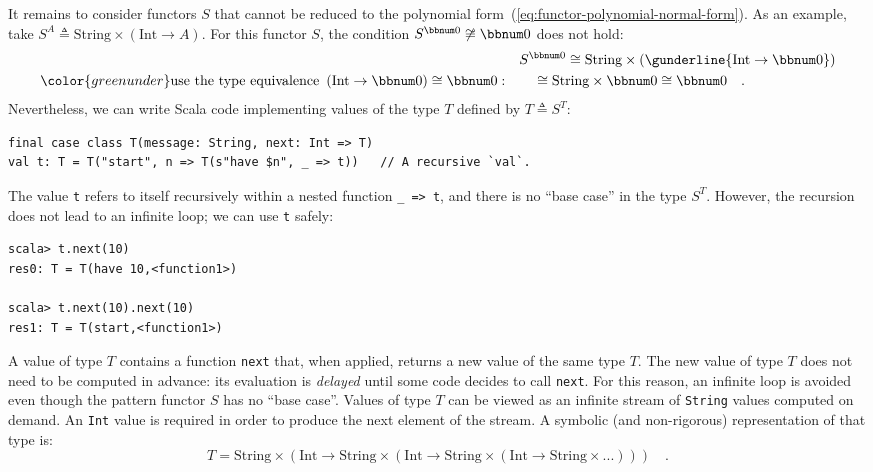 It remains to consider functors $S$ that cannot be reduced to the
polynomial form~(\ref{eq:functor-polynomial-normal-form}). As an
example, take $S^{A}\triangleq\text{String}\times(\text{Int}\rightarrow A)$.
For this functor $S$, the condition $S^{\bbnum 0}\not\cong\bbnum 0$
does not hold:
\begin{align*}
 & S^{\bbnum 0}\cong\text{String}\times(\gunderline{\text{Int}\rightarrow\bbnum 0})\\
{\color{greenunder}\text{use the type equivalence }\left(\text{Int}\rightarrow\bbnum 0\right)\cong\bbnum 0:}\quad & \quad\cong\text{String}\times\bbnum 0\cong\bbnum 0\quad.
\end{align*}
Nevertheless, we can write Scala code implementing values of the type
$T$ defined by $T\triangleq S^{T}$:
\begin{lstlisting}
final case class T(message: String, next: Int => T)
val t: T = T("start", n => T(s"have $n", _ => t))   // A recursive `val`.
\end{lstlisting}
The value \lstinline!t! refers to itself recursively within a nested
function \lstinline!_ => t!, and there is no \textsf{``}base case\textsf{''} in the
type $S^{T}$. However, the recursion does not lead to an infinite
loop; we can use \lstinline!t! safely:
\begin{lstlisting}
scala> t.next(10)
res0: T = T(have 10,<function1>)

scala> t.next(10).next(10)
res1: T = T(start,<function1>)
\end{lstlisting}
A value of type $T$ contains a function \lstinline!next! that, when
applied, returns a new value of the same type $T$. The new value
of type $T$ does not need to be computed in advance: its evaluation
is \emph{delayed} until some code decides to call \lstinline!next!.
For this reason, an infinite loop is avoided even though the pattern
functor $S$ has no \textsf{``}base case\textsf{''}. Values of type $T$ can be viewed
as an infinite stream of \lstinline!String! values computed on demand.
An \lstinline!Int! value is required in order to produce the next
element of the stream. A symbolic (and non-rigorous) representation
of that type is:
\[
T=\text{String}\times(\text{Int}\rightarrow\text{String}\times(\text{Int}\rightarrow\text{String}\times(\text{Int}\rightarrow\text{String}\times...)))\quad.
\]

